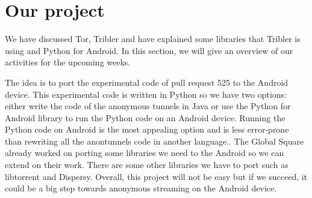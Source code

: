 \section{Our project}
	We have discussed Tor, Tribler and have explained some libraries that Tribler is using and Python for Android. In this section, we will give an overview of our activities for the upcoming weeks.
		
	The idea is to port the experimental code of pull request 525 to the Android device. This experimental code is written in Python so we have two options: either write the code of the anonymous tunnels in Java or use the Python for Android library to run the Python code on an Android device. Running the Python code on Android is the most appealing option and is less error-prone than rewriting all the anontunnels code in another language.. The Global Square already worked on porting some libraries we need to the Android so we can extend on their work. There are some other libraries we have to port such as libtorrent and Dispersy. Overall, this project will not be easy but if we succeed, it could be a big step towards anonymous streaming on the Android device.